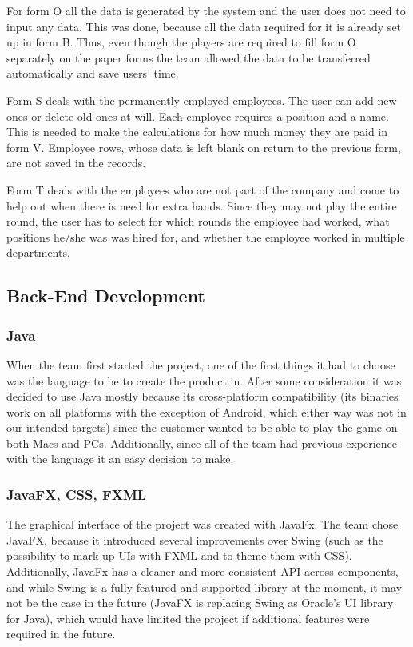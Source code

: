 \documentclass{l3proj}
\begin{document}
For form O all the data is generated by the system and the user does not need to input any data. This was done, because all the data required for it is already set up in form B. Thus, even though the players are required to fill form O separately on the paper forms the team allowed the data to be transferred automatically and save users' time.

Form S deals with the permanently employed employees. The user can add new ones or delete old ones at will. Each employee requires a position and a name. This is needed to make the calculations for how much money they are paid in form V. Employee rows, whose data is left blank on return to the previous form, are not saved in the records.

Form T deals with the employees who are not part of the company and come to help out when there is need for extra hands. Since they may not play the entire round, the user has to select for which rounds the employee had worked, what positions  he/she was was hired for, and whether the employee worked in multiple departments.

\subsection{Back-End Development}
\subsubsection{Java}
When the team first started the project, one of the first things it had to choose was the language to be to create the product in. After some consideration it was decided to use Java mostly because its cross-platform compatibility (its binaries work on all platforms with the exception of Android, which either way was not in our intended targets) since the customer wanted to be able to play the game on both Macs and PCs. Additionally, since all of the team had previous experience with the language it an easy decision to make.


\subsubsection{JavaFX, CSS, FXML}
The graphical interface of the project was created with JavaFx. The team chose JavaFX, because it introduced several improvements over Swing (such as the possibility to mark-up UIs with FXML and to theme them with CSS). Additionally, JavaFx has a cleaner and more consistent API across components, and while Swing is a fully featured and supported library at the moment, it may not be the case in the future (JavaFX is replacing Swing as Oracle's UI library for Java), which would have limited the project if additional features were required in the future.
\end{document}
